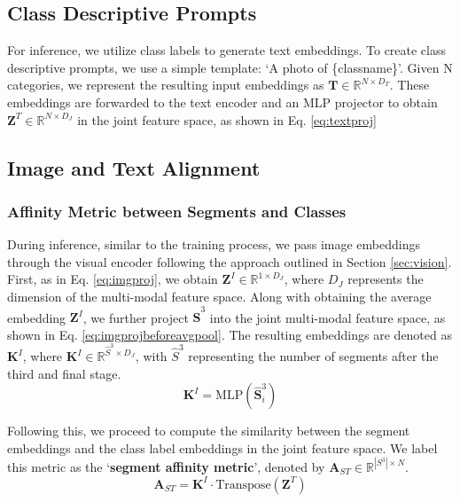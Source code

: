 \subsection{Class Descriptive Prompts}
For inference, we utilize class labels to generate text embeddings. To create class descriptive prompts, we use a simple template: `A photo of \{classname\}'. Given N categories, we represent the resulting input embeddings as $\textbf{T} \in \mathbb{R}^{N \times D_T}$. These embeddings are forwarded to the text encoder and an MLP projector to obtain $\textbf{Z}^T \in \mathbb{R}^{N \times D_J}$ in the joint feature space, as shown in Eq. \ref{eq:textproj}

\subsection{Image and Text Alignment}

\subsubsection{Affinity Metric between Segments and Classes}
During inference, similar to the training process, we pass image embeddings through the visual encoder following the approach outlined in Section \ref{sec:vision}. First, as in Eq. \ref{eq:imgproj}, we obtain $\textbf{Z}^I \in \mathbb{R}^{1 \times D_{J}}$, where $D_{J}$ represents the dimension of the multi-modal feature space. Along with obtaining the average embedding  $\textbf{Z}^I$, we further project $\hat{\textbf{S}}^3$ into the joint multi-modal feature space, as shown in Eq. \ref{eq:imgprojbeforeavgpool}. The resulting embeddings are denoted as $\textbf{K}^I$, where ${\textbf{K}^I} \in \mathbb{R}^{\hat{S}^3 \times D_J}$, with $\hat{S}^3$ representing the number of segments after the third and final stage.
\begin{equation}
\label{eq:imgprojbeforeavgpool}
    \textbf{K}^I = \text{MLP}( \hat{\textbf{S}}_i^{3})
\end{equation}

 Following this, we proceed to compute the similarity between the segment embeddings and the class label embeddings in the joint feature space. We label this metric as the `\textbf{segment affinity metric}', denoted by $\textbf{A}_{ST} \in \mathbb{R}^{|S^3| \times N}$.
\begin{equation}
\label{eq:simmat}
\text{$\textbf{A}_{ST}$}   =  \textbf{K}^I \cdot \text{Transpose}(\textbf{Z}^T)
\end{equation}

